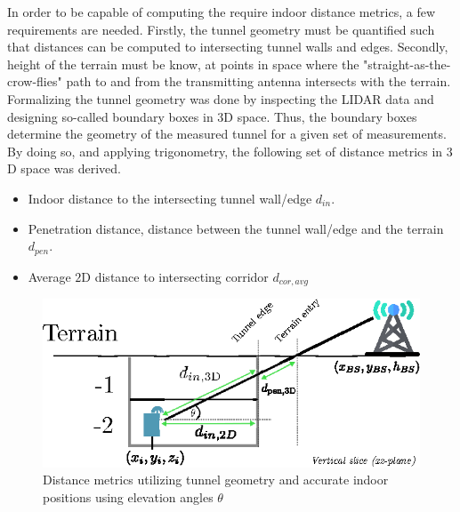 In order to be capable of computing the require indoor distance metrics, a few requirements are needed. Firstly, the tunnel geometry must be quantified such that distances can be computed to intersecting tunnel walls and edges. Secondly, height of the terrain must be know, at points in space where the "straight-as-the-crow-flies" path to and from the transmitting antenna intersects with the terrain. Formalizing the tunnel geometry was done by inspecting the LIDAR data and designing so-called boundary boxes in $3$D space. Thus, the boundary boxes determine the geometry of the measured tunnel for a given set of measurements. By doing so, and applying trigonometry, the following set of distance metrics in $3$D space was derived.

\begin{itemize}
    \item Indoor distance to the intersecting tunnel wall/edge $d_{in}$.
    \item Penetration distance, distance between the tunnel wall/edge and the terrain $d_{pen}$.
    \item Average $2$D distance to intersecting corridor $d_{cor,avg}$
\end{itemize}


\begin{figure}
    \centering
    \includegraphics{chapters/part_pathloss/figures/outdoor_to_indoor/inside_distance_illustration.eps}
    \caption{Distance metrics utilizing tunnel geometry and accurate indoor positions using elevation angles $\theta$}
    \label{fig:inside_distance_xz}
\end{figure}

